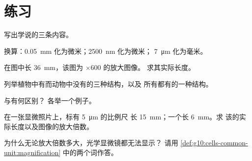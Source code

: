\section{练习}

\begin{exercise}[$\star$]\label{exo:g10:cells-common-unit:1}
写出学说的三条内容。
\end{exercise}

\begin{exercise}[$\star$]\label{exo:g10:cells-common-unit:2}
换算：\qty{0.05}{mm} 化为微米；\qty{2500}{nm} 化为微米；
\qty{7}{\micro m} 化为毫米。
\end{exercise}

\begin{exercise}[$\star$]\label{exo:g10:cells-common-unit:3}
在图中长 \qty{36}{mm}，该图为 $\times 600$ 的放大图像。
求其实际长度。
\end{exercise}

\begin{exercise}[$\star$]\label{exo:g10:cells-common-unit:4}
列举植物中有而动物中没有的三种结构，以及
所有都有的一种结构。
\end{exercise}

\begin{exercise}[$\star$]\label{exo:g10:cells-common-unit:5}
与有何区别？
各举一个例子。
\end{exercise}

\begin{exercise}[$\star\star$]\label{exo:g10:cells-common-unit:6}
在一张显微照片上，标有 \qty{5}{\micro m} 的比例尺
长 \qty{15}{mm}；一个长 \qty{6}{mm}。求
该的实际长度以及图像的放大倍数。
\end{exercise}

\begin{exercise}[$\star\star$]\label{exo:g10:cells-common-unit:7}
为什么无论放大倍数多大，光学显微镜都无法显示？
请用
\cref{def:g10:cells-common-unit:magnification} 中的两个词作答。
\end{exercise}

